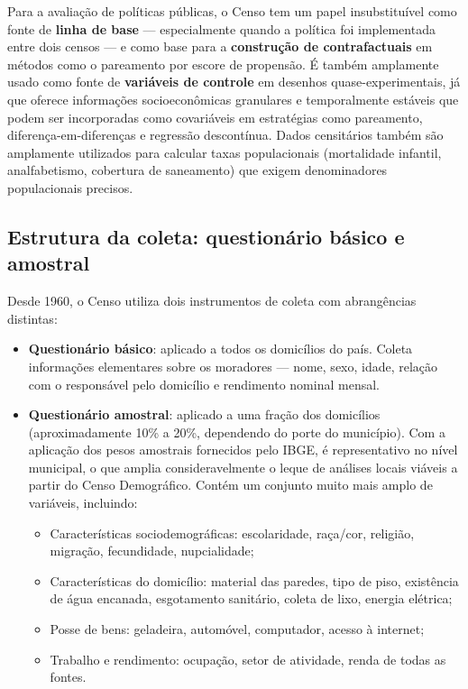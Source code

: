 Para a avaliação de políticas públicas, o Censo tem um papel insubstituível como fonte de \textbf{linha de base} --- especialmente quando a política foi implementada entre dois censos --- e como base para a \textbf{construção de contrafactuais} em métodos como o pareamento por escore de propensão. É também amplamente usado como fonte de \textbf{variáveis de controle} em desenhos quase-experimentais, já que oferece informações socioeconômicas granulares e temporalmente estáveis que podem ser incorporadas como covariáveis em estratégias como pareamento, diferença-em-diferenças e regressão descontínua. Dados censitários também são amplamente utilizados para calcular taxas populacionais (mortalidade infantil, analfabetismo, cobertura de saneamento) que exigem denominadores populacionais precisos.

\subsection{Estrutura da coleta: questionário básico e amostral}

Desde 1960, o Censo utiliza dois instrumentos de coleta com abrangências distintas:

\begin{itemize}
  \item \textbf{Questionário básico}: aplicado a todos os domicílios do país. Coleta informações elementares sobre os moradores --- nome, sexo, idade, relação com o responsável pelo domicílio e rendimento nominal mensal.

  \item \textbf{Questionário amostral}: aplicado a uma fração dos domicílios (aproximadamente 10\% a 20\%, dependendo do porte do município). Com a aplicação dos pesos amostrais fornecidos pelo IBGE, é representativo no nível municipal, o que amplia consideravelmente o leque de análises locais viáveis a partir do Censo Demográfico. Contém um conjunto muito mais amplo de variáveis, incluindo:
  \begin{itemize}
    \item Características sociodemográficas: escolaridade, raça/cor, religião, migração, fecundidade, nupcialidade;
    \item Características do domicílio: material das paredes, tipo de piso, existência de água encanada, esgotamento sanitário, coleta de lixo, energia elétrica;
    \item Posse de bens: geladeira, automóvel, computador, acesso à internet;
    \item Trabalho e rendimento: ocupação, setor de atividade, renda de todas as fontes.
  \end{itemize}
\end{itemize}

